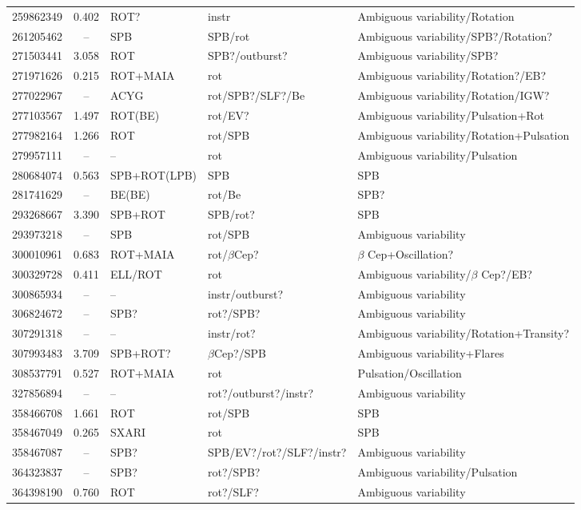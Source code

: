 \documentclass[RNAAS]{aastex63}
\begin{document}
\begin{table}[h]
\begin{tabular}{rclll}
259862349	&	0.402	& ROT?&	instr	&	Ambiguous variability/Rotation	\\
261205462	&	--		& SPB&	SPB/rot	&	Ambiguous variability/SPB?/Rotation?	\\
271503441	&	3.058	& ROT&	SPB?/outburst?	&	Ambiguous variability/SPB?\\
271971626	&	0.215	& ROT+MAIA&	rot	&	Ambiguous variability/Rotation?/EB?	\\
277022967	&	--	& ACYG&	rot/SPB?/SLF?/Be	&	Ambiguous variability/Rotation/IGW?	\\
277103567	&	1.497	& ROT(BE)&	rot/EV?	&	Ambiguous variability/Pulsation+Rot	\\
277982164	&	1.266	& ROT&	rot/SPB	&	Ambiguous variability/Rotation+Pulsation	\\
279957111	&	--	&  -- &	rot	&	Ambiguous variability/Pulsation	\\
280684074	&	0.563	& SPB+ROT(LPB)&	SPB 	&	SPB 	\\
281741629	&	--	& BE(BE)&	rot/Be	&	SPB?	\\
293268667	&	3.390	& SPB+ROT&	SPB/rot?   	&	SPB	\\
293973218	&	--	& SPB&	rot/SPB	&	Ambiguous variability	\\
300010961	&	0.683	& ROT+MAIA&	rot/$\beta$Cep?	&	$\beta$ Cep+Oscillation?	\\
300329728	&	0.411	& ELL/ROT&	rot	&	Ambiguous variability/$\beta$ Cep?/EB?	\\
300865934	&	--	&  -- &	instr/outburst?	&		Ambiguous variability\\
306824672	&	--	& SPB?&	rot?/SPB?	&	Ambiguous variability	\\
307291318	&	--		&  -- &	instr/rot?	&	Ambiguous variability/Rotation+Transity?	\\
307993483	&	3.709	& SPB+ROT?&	$\beta$Cep?/SPB 	&	Ambiguous variability+Flares   	\\
308537791	&	0.527	& ROT+MAIA&	rot	&	Pulsation/Oscillation	\\
327856894	&	--	&  -- &	rot?/outburst?/instr?	&	Ambiguous variability	\\
358466708	&	1.661	& ROT&	rot/SPB   	&	SPB 	\\
358467049	&	0.265	& SXARI&	rot	&	SPB	\\
358467087	&	--	& SPB?&	SPB/EV?/rot?/SLF?/instr?	&	Ambiguous variability	\\
364323837	&	--& SPB?	&	rot?/SPB?	&	Ambiguous variability/Pulsation	\\
364398190	&	0.760	& ROT&	rot?/SLF? 	&	Ambiguous variability   	\\

\end{tabular}
\end{table}
\end{document}
